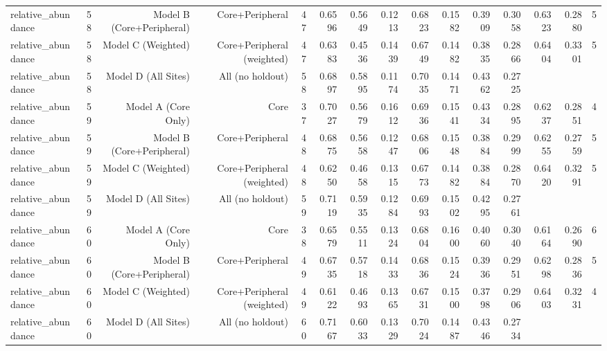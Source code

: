 {\begin{longtable}{lrrrrrrrrrrrrrr}
  relative\_abundance & 58 & Model B (Core+Peripheral) & Core+Peripheral & 47 & 0.6596 & 0.5649 & 0.1213 & 0.6823 & 0.1582 & 0.3909 & 0.3058 & 0.6323 & 0.2880 & 5 \\
  relative\_abundance & 58 & Model C (Weighted) & Core+Peripheral (weighted) & 47 & 0.6383 & 0.4536 & 0.1439 & 0.6749 & 0.1482 & 0.3835 & 0.2866 & 0.6404 & 0.3301 & 5 \\
  relative\_abundance & 58 & Model D (All Sites) & All (no holdout) & 58 & 0.6897 & 0.5895 & 0.1174 & 0.7035 & 0.1471 & 0.4362 & 0.2725 &  &  &  \\
  relative\_abundance & 59 & Model A (Core Only) & Core & 37 & 0.7027 & 0.5679 & 0.1612 & 0.6936 & 0.1541 & 0.4334 & 0.2895 & 0.6237 & 0.2851 & 4 \\
  relative\_abundance & 59 & Model B (Core+Peripheral) & Core+Peripheral & 48 & 0.6875 & 0.5658 & 0.1247 & 0.6806 & 0.1548 & 0.3884 & 0.2999 & 0.6255 & 0.2759 & 5 \\
  relative\_abundance & 59 & Model C (Weighted) & Core+Peripheral (weighted) & 48 & 0.6250 & 0.4658 & 0.1315 & 0.6773 & 0.1482 & 0.3884 & 0.2870 & 0.6420 & 0.3291 & 5 \\
  relative\_abundance & 59 & Model D (All Sites) & All (no holdout) & 59 & 0.7119 & 0.5935 & 0.1284 & 0.6993 & 0.1502 & 0.4295 & 0.2761 &  &  &  \\
  relative\_abundance & 60 & Model A (Core Only) & Core & 38 & 0.6579 & 0.5511 & 0.1324 & 0.6804 & 0.1600 & 0.4060 & 0.3040 & 0.6164 & 0.2690 & 6 \\
  relative\_abundance & 60 & Model B (Core+Peripheral) & Core+Peripheral & 49 & 0.6735 & 0.5718 & 0.1433 & 0.6836 & 0.1524 & 0.3936 & 0.2951 & 0.6298 & 0.2836 & 5 \\
  relative\_abundance & 60 & Model C (Weighted) & Core+Peripheral (weighted) & 49 & 0.6122 & 0.4693 & 0.1365 & 0.6731 & 0.1500 & 0.3798 & 0.2906 & 0.6403 & 0.3231 & 4 \\
  relative\_abundance & 60 & Model D (All Sites) & All (no holdout) & 60 & 0.7167 & 0.6033 & 0.1329 & 0.7024 & 0.1487 & 0.4346 & 0.2734 &  &  &  \\
\end{longtable}
}
